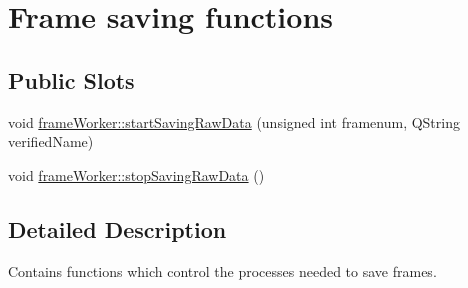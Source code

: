 \hypertarget{group__savingfunc}{\section{Frame saving functions}
\label{group__savingfunc}
}
\subsection*{Public Slots}
\begin{DoxyCompactItemize}
\item 
void \hyperlink{group__savingfunc_ga3b93022717727f137956e74db96090b2}{frame\+Worker\+::start\+Saving\+Raw\+Data} (unsigned int framenum, Q\+String verified\+Name)
\item 
void \hyperlink{group__savingfunc_ga0bc169f3c9b7144eca0409d78a8698fa}{frame\+Worker\+::stop\+Saving\+Raw\+Data} ()
\end{DoxyCompactItemize}


\subsection{Detailed Description}
Contains functions which control the processes needed to save frames. 

